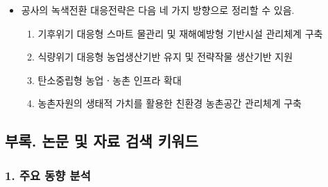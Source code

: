 \begin{itemize}
    \item 공사의 녹색전환 대응전략은 다음 네 가지 방향으로 정리할 수 있음.
    \begin{enumerate}
        \item 기후위기 대응형 스마트 물관리 및 재해예방형 기반시설 관리체계 구축
        \item 식량위기 대응형 농업생산기반 유지 및 전략작물 생산기반 지원
        \item 탄소중립형 농업ㆍ농촌 인프라 확대
        \item 농촌자원의 생태적 가치를 활용한 친환경 농촌공간 관리체계 구축
    \end{enumerate}
\end{itemize}

\newpage

\subsection*{부록. 논문 및 자료 검색 키워드}

\subsubsection*{1. 주요 동향 분석}

